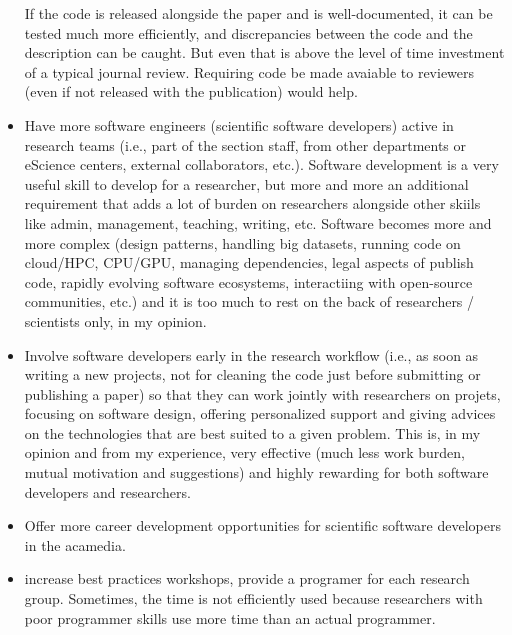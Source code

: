 \documentclass{article}
\begin{document}
\begin{itemize}
If the code is released alongside the paper and is well-documented, it can be tested much more efficiently, and discrepancies between the code and the description can be caught. But even that is above the level of time investment of a typical journal review. Requiring code be made avaiable to reviewers (even if not released with the publication) would help.
\item Have more software engineers (scientific software developers) active in research teams (i.e., part of the section staff, from other departments or eScience centers, external collaborators, etc.). Software development is a very useful skill to develop for a researcher, but more and more an additional requirement that adds a lot of burden on researchers alongside other skiils like admin, management, teaching, writing, etc. Software becomes more and more complex (design patterns, handling big datasets, running code on cloud/HPC, CPU/GPU, managing dependencies, legal aspects of publish code, rapidly evolving software ecosystems, interactiing with open-source communities, etc.) and it is too much to rest on the back of researchers / scientists only, in my opinion.
\item Involve software developers early in the research workflow (i.e., as soon as writing a new projects, not for cleaning the code just before submitting or publishing a paper) so that they can work jointly with researchers on projets, focusing on software design, offering personalized support and giving advices on the technologies that are best suited to a given problem. This is, in my opinion and from my experience, very effective (much less work burden, mutual motivation and suggestions) and highly rewarding for both software developers and researchers.
	\item Offer more career development opportunities for scientific software developers in the acamedia.
	\item increase best practices workshops, provide a programer for each research group. Sometimes, the time is not efficiently used because researchers with poor programmer skills use more time than an actual programmer.
\end{itemize}
\end{document}
